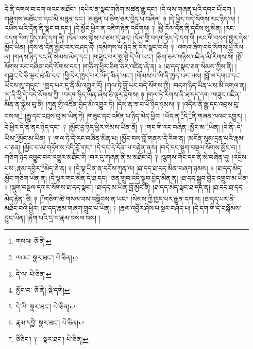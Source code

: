 དེ་ནི་འགལ་བ་དག་ལའང་མཐོང་། །དཔེར་ན་སྣང་གཅིག་མཚན་རྒྱུ་དང་། །དེ་ལས་གཞན་པའི་དབང་པོ་དག །གཟུགས་མཐོང་བ་དང་མི་མཐུན་དང་། །མཐུན་པ་ཅིག་ཅར་བྱེད་པ་བཞིན། ༈ །དེ་ཕྱིར་བདེ་སོགས་རང་ཉིད་ལ། །འཕོས་པའི་དོན་ནི་སྣང་བ་དང་། །དེ་མྱོང་ཕྱིར་ན་འཇིག་རྟེན་འདོགས། ༈ །ཕྱི་རོལ་དོན་ནི་དངོས་སུ་མིན། །རང་བདག་རིག་བྱེད་འདི་དག་ནི། །དོན་ལས་སྐྱེས་པ་ཙམ་དུ་ཟད། །དོན་གྱི་བདག་ཉིད་དེ་དག་གི །རང་གི་བདག་གྱུར་དེས་མྱོང་ཡིན། །དེས་ན་དོན་མྱོང་བར་བཤད་དེ། །དམིགས་པ་ཉིད་ནི་དེར་སྣང་བའོ། ༈ །འགའ་ཞིག་བདེ་སོགས་ཕྱི་རོལ་ན། །གནས་ཉིད་དང་ནི་སེམས་མེད་དང་། །གཟུང་བར་སྨྲ་སྟེ་དེ་ཡི་ཡང་། །ཅིག་ཅར་གཉིས་འཛིན་མི་རིགས་སོ། །སྔོ་སོགས་རང་བཞིན་བདེ་སོགས་དང་། །གཅིག་ཕྱིར་ཅིག་ཅར་འཛིན་ཞེ་ན། ༈ །ཐ་དད་སྣང་ཅན་སེམས་ཀྱིས་ནི། །གཟུང་དེ་ཅི་ལྟར་ཐ་མི་དད། །ཕྱི་དེར་ཁྱད་པར་ཡོད་མིན་ཡང་། །གོམས་པ་ཡི་ནི་ཁྱད་པར་ལས། །བློ་ལ་དགའ་དང་ཡོངས་སུ་གདུང་། །ཁྱད་པར་དུ་ནི་མི་འགྱུར་རོ། །གལ་ཏེ་བློ་ཡང་བདེ་སོགས་ཀྱི། །བདག་ཉིད་ཡིན་པས་མི་འགལ་ན། །ད་ནི་ཕྱི་དེ་བདེ་སོགས་ཀྱི། །བདག་ཉིད་ཡིན་ཞེས་ཅི་ལྟར་རྟོགས། ༈ །གལ་ཏེ་རིགས་ནི་ཐ་དད་དག །གཟུང་འཛིན་མིན་ན་སྐྱེས་བུ་ནི། །ཀུན་གྱི་འཛིན་བྱེད་མི་འགྱུར་ཏེ། །དེས་ན་ཟ་བ་པོ་ཉིད་ཉམས། ༈ །འདིས་ནི་རྒྱུ་དང་འབྲས་བུ་བསལ།\footnote{གསལ།  ཅོ་ནེ། } །རྒྱུ་དང་འབྲས་བུ་མ་ཡིན་ཏེ། །གཟུང་དང་འཛིན་པ་ཉིད་མེད་ཕྱིར། །ཡོད་ན་\footnote{ལའང་  སྣར་ཐང་།  པེ་ཅིན། }དེ་\footnote{དེ་ལ་  པེ་ཅིན། }ནི་གཞན་ལའང་འགྱུར། །དེ་ཕྱིར་དེ་ནི་ནང་ཉིད་དང་། ༈ །མྱོང་བྱ་ཉིད་ཕྱིར་སེམས་ཡིན་ནོ། ༈ །གང་གི་རང་བཞིན་:མྱོང་མ་\footnote{མྱོང་བ་  ཅོ་ནེ།  སྡེ་དགེ། }ཡིན། །དེ་ནི་:དེ་ཡིས་\footnote{དེ་ཡི་  སྣར་ཐང་།  པེ་ཅིན། }མྱོང་མ་ཡིན། ༈ །གལ་ཏེ་དེ་རང་བཞིན་མིན་པ། །མྱོང་བས་བློ་གནས་དེ་རིག་ན། །མངོན་སུམ་དྲན་པའི་རྣམ་པ་ཅན། །མྱོང་བ་མ་གཏོགས་འདི་བློ་གང་། །དེ་དང་དེ་དོན་ལ་བརྟེན་ནས། །བདེ་དང་སྡུག་བསྔལ་སོགས་མྱོང་བ། །གཅིག་ཉིད་འབྱུང་བར་འགྱུར་མཐོང་གི །བར་དུ་གཞན་ནི་མ་མཐོང་ངོ། ༈ །ལྕགས་གོང་དང་ནི་མེ་བཞིན་དུ། །འདྲེས་པས་:རྣམ་དབྱེར་\footnote{རྣམ་དབྱེ་  སྣར་ཐང་།  པེ་ཅིན། }མེད་ཅེ་ན། ༈ །དེ་ལྟ་ཡིན་ན་དངོས་ཀུན་ལ། །ཐ་དད་ཐ་དད་མིན་བཞག་ཉམས། ༈ །ཐ་དད་མེད་མྱོང་གཅིག་ཡིན་ན། །དེ་ལྟར་གང་མིན་དེ་ཐ་དད། །ཅན་གྲུབ་འདི་སྒྲུབ་བྱེད་མིན་ན། །ཐ་དད་སྒྲུབ་བྱེད་འགྲུབ་མ་ཡིན། ༈ །སྡུག་བསྔལ་དཀར་སོགས་ཐ་དད་སྣང་། །ཐ་དད་མ་ཡིན་བློ་མྱོང་ནི། །ཐ་དད་མེད་སྣང་ཐ་དད་ན། །ཐ་དད་ཐ་དད་མེད་རྟེན་:ཅི། ༈ །\footnote{ཅིཅིང་། ༈ །  སྣར་ཐང་།  པེ་ཅིན། }གཅིག་ཚེ་གསལ་བས་བསྒྲིབས་ན་ཡང་། །སེམས་ཀྱི་ཁྱད་པར་རྒྱུན་དག་ལ། །ཐ་དད་པར་ནི་མཐོང་བའི་ཕྱིར། །ཐ་དད་རྣམ་གཞག་གྲུབ་པ་ཡིན། ༈ །རྣལ་འབྱོར་ཤེས་པ་སྔར་བཤད་པ། །དེ་དག་གི་དེ་བསྒོམས་བྱུང་ཡིན། །རྟོག་པའི་དྲ་བ་རྣམ་བསལ་བས། །
